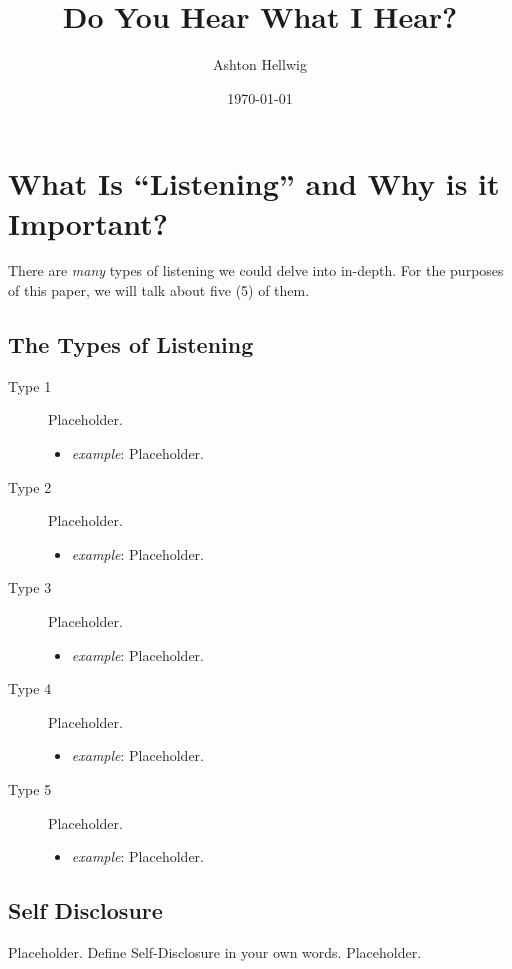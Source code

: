 \documentclass[stu,12pt]{apa7}
\title{%
    Do You Hear What I Hear?
  }
\author{Ashton Hellwig}
\date{\today}
\begin{document}
  \maketitle


  \section{What Is ``Listening'' and Why is it Important?}
    There are \textit{many} types of listening we could delve into in-depth.
      For the purposes of this paper, we will talk about five (5) of them.

    \subsection{The Types of Listening}
      \begin{description}
        \item[Type 1]
          Placeholder.
          \begin{itemize}
            \item \textit{example}: Placeholder.
          \end{itemize}
        \item[Type 2]
          Placeholder.
          \begin{itemize}
            \item \textit{example}: Placeholder.
          \end{itemize}
        \item[Type 3]
          Placeholder.
          \begin{itemize}
            \item \textit{example}: Placeholder.
          \end{itemize}
        \item[Type 4]
          Placeholder.
          \begin{itemize}
            \item \textit{example}: Placeholder.
          \end{itemize}
        \item[Type 5]
          Placeholder.
          \begin{itemize}
            \item \textit{example}: Placeholder.
          \end{itemize}
      \end{description}


    \subsection{Self Disclosure}
      Placeholder. Define Self-Disclosure in your own words. Placeholder.
\end{document}
